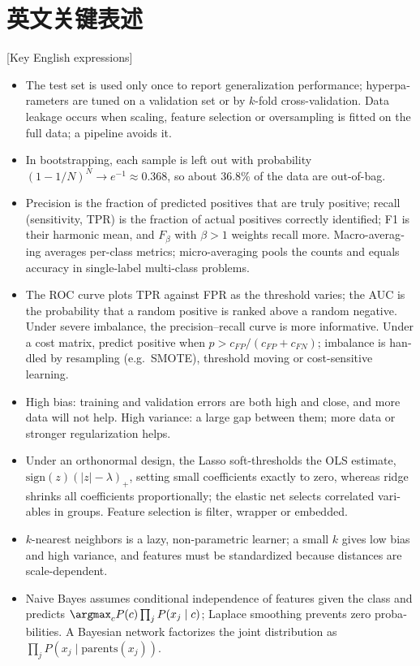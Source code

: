 \section{英文关键表述}
\begin{english}[Key English expressions]
\footnotesize
\begin{itemize}
\item The test set is used only once to report generalization performance; hyperparameters are tuned on a validation set or by $k$-fold cross-validation. Data leakage occurs when scaling, feature selection or oversampling is fitted on the full data; a pipeline avoids it.
\item In bootstrapping, each sample is left out with probability $(1-1/N)^N\to e^{-1}\approx0.368$, so about 36.8\% of the data are out-of-bag.
\item Precision is the fraction of predicted positives that are truly positive; recall (sensitivity, TPR) is the fraction of actual positives correctly identified; F1 is their harmonic mean, and $F_\beta$ with $\beta>1$ weights recall more. Macro-averaging averages per-class metrics; micro-averaging pools the counts and equals accuracy in single-label multi-class problems.
\item The ROC curve plots TPR against FPR as the threshold varies; the AUC is the probability that a random positive is ranked above a random negative. Under severe imbalance, the precision--recall curve is more informative. Under a cost matrix, predict positive when $p>c_{FP}/(c_{FP}+c_{FN})$; imbalance is handled by resampling (e.g.\ SMOTE), threshold moving or cost-sensitive learning.
\item High bias: training and validation errors are both high and close, and more data will not help. High variance: a large gap between them; more data or stronger regularization helps.
\item Under an orthonormal design, the Lasso soft-thresholds the OLS estimate, $\mathrm{sign}(z)(|z|-\lambda)_+$, setting small coefficients exactly to zero, whereas ridge shrinks all coefficients proportionally; the elastic net selects correlated variables in groups. Feature selection is filter, wrapper or embedded.
\item $k$-nearest neighbors is a lazy, non-parametric learner; a small $k$ gives low bias and high variance, and features must be standardized because distances are scale-dependent.
\item Naive Bayes assumes conditional independence of features given the class and predicts $\argmax_cP(c)\prod_jP(x_j\mid c)$; Laplace smoothing prevents zero probabilities. A Bayesian network factorizes the joint distribution as $\prod_jP(x_j\mid\mathrm{parents}(x_j))$.

\end{itemize}
\end{english}
